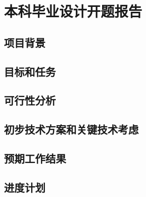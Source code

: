 \chapter{本科毕业设计开题报告}

\section{项目背景}

\section{目标和任务}

\section{可行性分析}

\section{初步技术方案和关键技术考虑}

\section{预期工作结果}

\section{进度计划}
